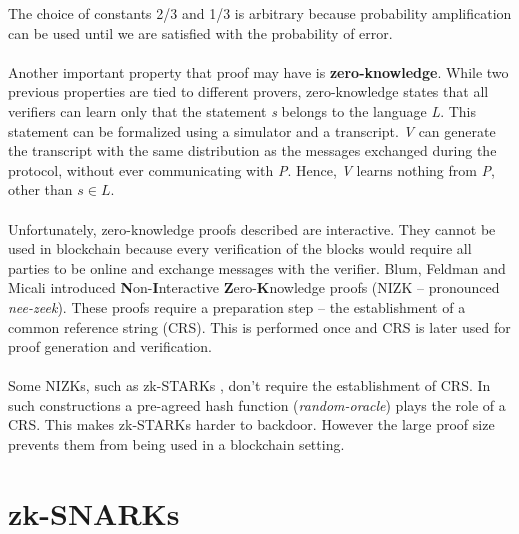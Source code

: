 \noindent The choice of constants 2/3 and 1/3 is arbitrary because probability amplification can be used until we are satisfied with the probability of error.\\
\\
Another important property that proof may have is \textbf{zero-knowledge}. While two previous properties are tied to different provers, zero-knowledge states that all verifiers can learn only that the statement \textit{s} belongs to the language \textit{L}. This statement can be formalized using a simulator and a transcript. \textit{V} can generate the transcript with the same distribution as the messages exchanged during the protocol, without ever communicating with \textit{P}. Hence, \textit{V} learns nothing from \textit{P}, other than $s \in L$.\\
\\
Unfortunately, zero-knowledge proofs described are interactive. They cannot be used in blockchain because every verification of the blocks would require all parties to be online and exchange messages with the verifier. Blum, Feldman and Micali \cite{blum1988non} introduced \textbf{N}on-\textbf{I}nteractive \textbf{Z}ero-\textbf{K}nowledge proofs (NIZK -- pronounced \textit{nee-zeek}). These proofs require a preparation step -- the establishment of a common reference string (CRS). This is performed once and CRS is later used for proof generation and verification.\\
\\
Some NIZKs, such as zk-STARKs \cite{ben2018scalable}, don't require the establishment of CRS. In such constructions a pre-agreed hash function (\textit{random-oracle}) plays the role of a CRS. This makes zk-STARKs harder to backdoor. However the large proof size prevents them from being used in a blockchain setting.

\section{zk-SNARKs}

